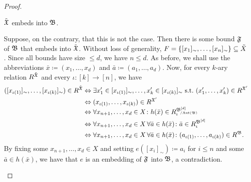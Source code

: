 \begin{proof}
        \begin{claim} \label{claim:embedding} $\Tilde{\mathfrak{X}}$ embeds into $\mathfrak{B}$.
        \end{claim} 
        \begin{claimproof}
        Suppose, on the contrary, that this is not the case.
        Then there is some bound $\mathfrak{F}$ of $\mathfrak{B}$ that embeds into $\Tilde{\mathfrak{X}}$.
        Without loss of generality, $F=\{[x_1]_\sim,\dots,[x_n]_\sim\}\subseteq \Tilde{X}$.
        Since all bounds have size $\leq d$, we have $n\leq d$.
        As before, we shall use the abbreviations $\bar{x}\coloneqq(x_1,\dots, x_d)$ and $\bar{a}\coloneqq(a_1,\dots, a_d)$.
        Now, for every $k$-ary relation $R^{\Tilde{\mathfrak{X}}}$ and every $\iota\colon [k]\to[n]$, we have  
        \begin{align*}
            ([x_{\iota(1)}]_\sim,\dots,[x_{\iota(k)}]_\sim)\in R^{\Tilde{\struct{X}}}  &\Leftrightarrow \exists x_1'\in[x_{\iota(1)}]_\sim,\dots,x_k'\in[x_{\iota(k)}]_\sim \text{ s.t.\ }
 (x_1',\dots,x_k') \in R^{\struct{X}'} \\
            &\Leftrightarrow (x_{\iota(1)},\dots,x_{\iota(k)}) \in R^{\struct{X}'} \\
            &\Leftrightarrow \forall x_{n+1},\dots,x_d\in X\colon    h(\bar{x}) \in R_{\iota}^{\smash{\fpwr{\struct{B}}{d}_{\orbeq{\Aut(\struct{B})}}}} \\
            &\Leftrightarrow \forall x_{n+1},\dots,x_d\in X\,\forall \bar{a} \in h(\bar{x})\colon \bar{a} \in  R_{\iota}^{\fpwr{\struct{B}}{d}} \\
            &\Leftrightarrow \forall x_{n+1},\dots,x_d\in X\,\forall \bar{a}\in h(\bar{x})\colon  (a_{\iota(1)},\dots,a_{\iota(k)}) \in R^{\struct{B}}.
        \end{align*}
        By fixing some $x_{n+1},\dots,x_d\in X$ and setting $e([x_i]_\sim) \coloneqq a_i$ for $i\leq n$ and some $\bar{a}\in h(\bar{x})$, we have that $e$ is an embedding of $\mathfrak{F}$ into $\mathfrak{B}$, a contradiction.
        \end{claimproof}
         

\end{proof}
